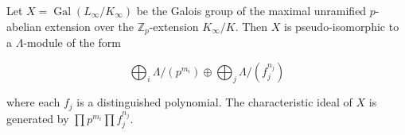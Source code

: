 Let $X = \operatorname{Gal}(L_{\infty}/K_{\infty})$ be the Galois group of the maximal unramified $p$-abelian extension over the $\mathbb{Z}_p$-extension $K_{\infty}/K$. Then $X$ is pseudo-isomorphic to a $\Lambda$-module of the form

$$\bigoplus_{i} \Lambda/(p^{m_i}) \oplus \bigoplus_{j} \Lambda/(f_j^{n_j})$$

where each $f_j$ is a distinguished polynomial. The characteristic ideal of $X$ is generated by $\prod p^{m_i} \prod f_j^{n_j}$.
